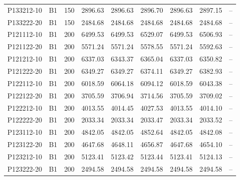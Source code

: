 \begin{longtable}{llrrrrrrr}
 P133212-10 & B1 & 150 & 2896.63 & 2896.63 & 2896.70 & 2896.63 & 2897.15 & -- \\
 P133222-20 & B1 & 150 & 2484.68 & 2484.68 & 2484.68 & 2484.68 & 2484.68 & -- \\
 P121112-10 & B1 & 200 & 6499.53 & 6499.53 & 6529.07 & 6499.53 & 6506.93 & -- \\
 P121122-20 & B1 & 200 & 5571.24 & 5571.24 & 5578.55 & 5571.24 & 5592.63 & -- \\
 P121212-10 & B1 & 200 & 6337.03 & 6343.37 & 6365.04 & 6337.03 & 6350.82 & -- \\
 P121222-20 & B1 & 200 & 6349.27 & 6349.27 & 6374.11 & 6349.27 & 6382.93 & -- \\
 P122112-10 & B1 & 200 & 6018.59 & 6064.18 & 6094.12 & 6018.59 & 6043.38 & -- \\
 P122122-20 & B1 & 200 & 3705.59 & 3706.94 & 3714.56 & 3705.59 & 3709.02 & -- \\
 P122212-10 & B1 & 200 & 4013.55 & 4014.45 & 4027.53 & 4013.55 & 4014.10 & -- \\
 P122222-20 & B1 & 200 & 2033.34 & 2033.34 & 2033.47 & 2033.34 & 2033.52 & -- \\
 P123112-10 & B1 & 200 & 4842.05 & 4842.05 & 4852.64 & 4842.05 & 4842.08 & -- \\
 P123122-20 & B1 & 200 & 4647.68 & 4648.11 & 4656.87 & 4647.68 & 4654.10 & -- \\
 P123212-10 & B1 & 200 & 5123.41 & 5123.42 & 5123.44 & 5123.41 & 5124.13 & -- \\
 P123222-20 & B1 & 200 & 2494.58 & 2494.58 & 2494.58 & 2494.58 & 2494.58 & -- \\
\hline
\end{longtable}
